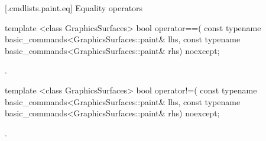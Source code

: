  [\iotwod.cmdlists.paint.eq] {Equality operators}%

%
\begin{itemdecl}
template <class GraphicsSurfaces>
bool operator==(
  const typename basic_commands<GraphicsSurfaces::paint& lhs,
  const typename basic_commands<GraphicsSurfaces::paint& rhs) 
  noexcept;
\end{itemdecl}
\begin{itemdescr}
\pnum
\returns {}.
\end{itemdescr}

%
\begin{itemdecl}
template <class GraphicsSurfaces>
bool operator!=(
  const typename basic_commands<GraphicsSurfaces::paint& lhs,
  const typename basic_commands<GraphicsSurfaces::paint& rhs) 
  noexcept;
\end{itemdecl}
\begin{itemdescr}
\pnum
\returns {}.
\end{itemdescr}
